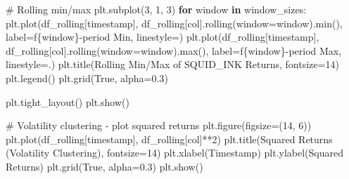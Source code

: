 \documentclass[
  letterpaper,
  DIV=11,
  numbers=noendperiod]{scrartcl}
\newenvironment{Shaded}{\begin{snugshade}}{\end{snugshade}}
\newcommand{\BuiltInTok}[1]{\textcolor[rgb]{0.00,0.23,0.31}{#1}}
\newcommand{\CommentTok}[1]{\textcolor[rgb]{0.37,0.37,0.37}{#1}}
\newcommand{\ControlFlowTok}[1]{\textcolor[rgb]{0.00,0.23,0.31}{\textbf{#1}}}
\newcommand{\DecValTok}[1]{\textcolor[rgb]{0.68,0.00,0.00}{#1}}
\newcommand{\FloatTok}[1]{\textcolor[rgb]{0.68,0.00,0.00}{#1}}
\newcommand{\KeywordTok}[1]{\textcolor[rgb]{0.00,0.23,0.31}{\textbf{#1}}}
\newcommand{\NormalTok}[1]{\textcolor[rgb]{0.00,0.23,0.31}{#1}}
\newcommand{\OperatorTok}[1]{\textcolor[rgb]{0.37,0.37,0.37}{#1}}
\newcommand{\SpecialCharTok}[1]{\textcolor[rgb]{0.37,0.37,0.37}{#1}}
\newcommand{\SpecialStringTok}[1]{\textcolor[rgb]{0.13,0.47,0.30}{#1}}
\newcommand{\StringTok}[1]{\textcolor[rgb]{0.13,0.47,0.30}{#1}}
\newcommand{\VariableTok}[1]{\textcolor[rgb]{0.07,0.07,0.07}{#1}}
\begin{document}
\begin{Shaded}
\begin{Highlighting}[]
    \CommentTok{\# Rolling min/max}
\NormalTok{    plt.subplot(}\DecValTok{3}\NormalTok{, }\DecValTok{1}\NormalTok{, }\DecValTok{3}\NormalTok{)}
    \ControlFlowTok{for}\NormalTok{ window }\KeywordTok{in}\NormalTok{ window\_sizes:}
\NormalTok{        plt.plot(df\_rolling[}\StringTok{\textquotesingle{}timestamp\textquotesingle{}}\NormalTok{], }
\NormalTok{                df\_rolling[col].rolling(window}\OperatorTok{=}\NormalTok{window).}\BuiltInTok{min}\NormalTok{(), }
\NormalTok{                label}\OperatorTok{=}\SpecialStringTok{f\textquotesingle{}}\SpecialCharTok{\{}\NormalTok{window}\SpecialCharTok{\}}\SpecialStringTok{{-}period Min\textquotesingle{}}\NormalTok{, linestyle}\OperatorTok{=}\StringTok{\textquotesingle{}{-}{-}\textquotesingle{}}\NormalTok{)}
\NormalTok{        plt.plot(df\_rolling[}\StringTok{\textquotesingle{}timestamp\textquotesingle{}}\NormalTok{], }
\NormalTok{                df\_rolling[col].rolling(window}\OperatorTok{=}\NormalTok{window).}\BuiltInTok{max}\NormalTok{(), }
\NormalTok{                label}\OperatorTok{=}\SpecialStringTok{f\textquotesingle{}}\SpecialCharTok{\{}\NormalTok{window}\SpecialCharTok{\}}\SpecialStringTok{{-}period Max\textquotesingle{}}\NormalTok{, linestyle}\OperatorTok{=}\StringTok{\textquotesingle{}{-}.\textquotesingle{}}\NormalTok{)}
\NormalTok{    plt.title(}\StringTok{\textquotesingle{}Rolling Min/Max of SQUID\_INK Returns\textquotesingle{}}\NormalTok{, fontsize}\OperatorTok{=}\DecValTok{14}\NormalTok{)}
\NormalTok{    plt.legend()}
\NormalTok{    plt.grid(}\VariableTok{True}\NormalTok{, alpha}\OperatorTok{=}\FloatTok{0.3}\NormalTok{)}

\NormalTok{    plt.tight\_layout()}
\NormalTok{    plt.show()}

    \CommentTok{\# Volatility clustering {-} plot squared returns}
\NormalTok{    plt.figure(figsize}\OperatorTok{=}\NormalTok{(}\DecValTok{14}\NormalTok{, }\DecValTok{6}\NormalTok{))}
\NormalTok{    plt.plot(df\_rolling[}\StringTok{\textquotesingle{}timestamp\textquotesingle{}}\NormalTok{], df\_rolling[col]}\OperatorTok{**}\DecValTok{2}\NormalTok{)}
\NormalTok{    plt.title(}\StringTok{\textquotesingle{}Squared Returns (Volatility Clustering)\textquotesingle{}}\NormalTok{, fontsize}\OperatorTok{=}\DecValTok{14}\NormalTok{)}
\NormalTok{    plt.xlabel(}\StringTok{\textquotesingle{}Timestamp\textquotesingle{}}\NormalTok{)}
\NormalTok{    plt.ylabel(}\StringTok{\textquotesingle{}Squared Returns\textquotesingle{}}\NormalTok{)}
\NormalTok{    plt.grid(}\VariableTok{True}\NormalTok{, alpha}\OperatorTok{=}\FloatTok{0.3}\NormalTok{)}
\NormalTok{    plt.show()}


\end{Highlighting}
\end{Shaded}
\end{document}

